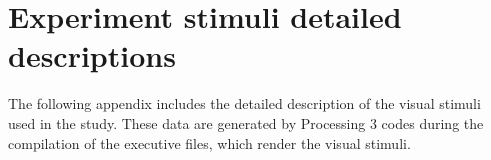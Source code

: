 \chapter{Experiment stimuli detailed descriptions}
\label{app:researchprotocol}
The following appendix includes the detailed description of the visual stimuli used in the study. These data are generated by Processing 3 codes during the compilation of the executive files, which render the visual stimuli.
